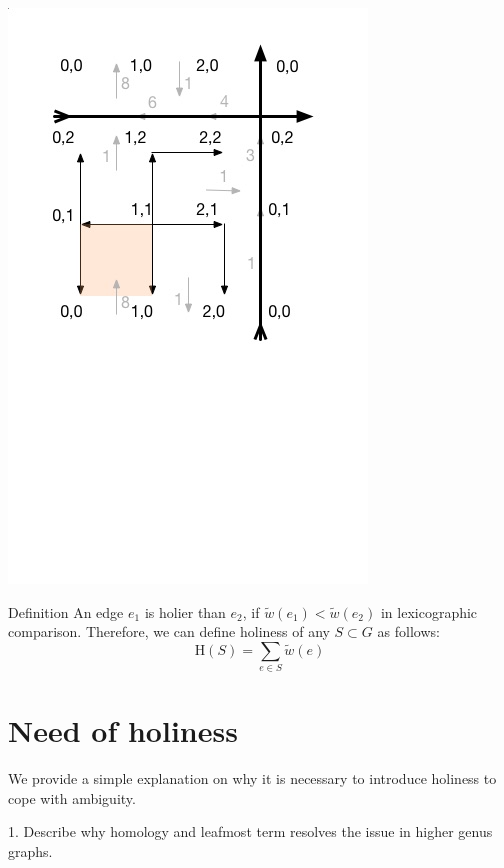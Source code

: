 \documentclass{article}
\begin{document}
\begin{center}
\includegraphics[scale = 0.5]{g1.jpg}
\end{center}
\vspace{-4.0cm} %

\begin{oneshot}{Definition}
An edge $e_1$ is holier than $e_2$, 
if $\tilde w(e_1) < \tilde w(e_2)$ in lexicographic comparison. 
Therefore, we can define holiness of any $S \subset G $ as follows:
\[\text{H}(S) = \sum \limits_{e \in S} \tilde w(e)\]
\end{oneshot}

\section{Need of holiness}
We provide a simple explanation on why it is necessary to introduce holiness
to cope with ambiguity. \\

\begin{center}
{\color{red}
1. Describe why homology and leafmost term resolves the issue in higher
genus graphs.}
\end{center}
\end{document}
